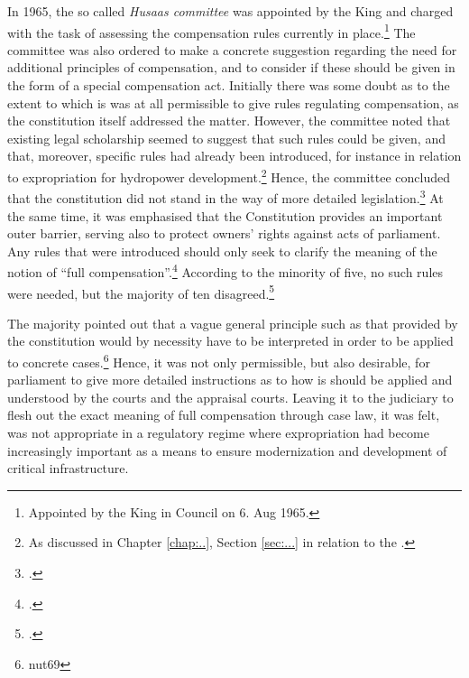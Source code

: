 In 1965, the so called \emph{Husaas committee} was appointed by the King and charged with the task of assessing the compensation rules currently in place.\footnote{Appointed by the King in Council on 6. Aug 1965.} The committee was also ordered to make a concrete suggestion regarding the need for additional principles of compensation, and to consider if these should be given in the form of a special compensation act. Initially there was some doubt as to the extent to which is was at all permissible to give rules regulating compensation, as the constitution itself addressed the matter. However, the committee noted that existing legal scholarship seemed to suggest that such rules could be given, and that, moreover, specific rules had already been introduced, for instance in relation to expropriation for hydropower development.\footnote{As discussed in Chapter \ref{chap:..}, Section \ref{sec:...} in relation to the \cite[16]{wra17}.} Hence, the committee concluded that the constitution did not stand in the way of more detailed legislation.\footnote{\cite[136]{nut69}.} At the same time, it was emphasised that the Constitution provides an important outer barrier, serving also to protect owners' rights against acts of parliament. Any rules that were introduced should only seek to clarify the meaning of the notion of ``full compensation''.\footnote{\cite[136-137]{nut69}.} According to the minority of five, no such rules were needed, but the majority of ten disagreed.\footcite[137]{nut69}

The majority pointed out that a vague general principle such as that provided by the constitution would by necessity have to be interpreted in order to be applied to concrete cases.\footnote[137]{nut69} Hence, it was not only permissible, but also desirable, for parliament to give more detailed instructions as to how is should be applied and understood by the courts and the appraisal courts. Leaving it to the judiciary to flesh out the exact meaning of full compensation through case law, it was felt, was not appropriate in a regulatory regime where expropriation had become increasingly important as a means to ensure modernization and development of critical infrastructure.


